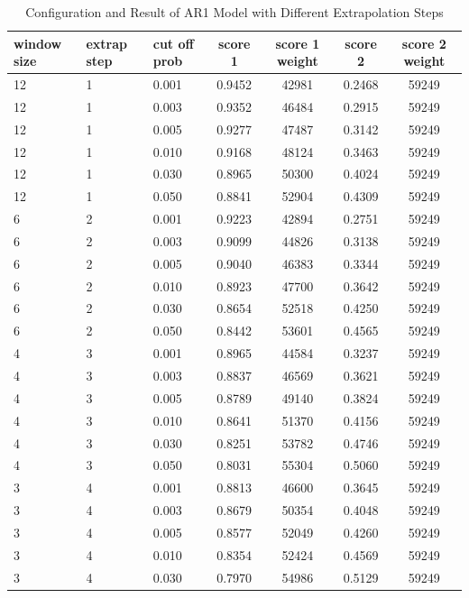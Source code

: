 \documentclass{article}
\begin{document}
\begin{longtable}[htbp]{l|l|l|*{4}{c}}
    \caption{Configuration and Result of AR1 Model with Different Extrapolation Steps}
    \label{tab:tab1.4.1} \\
    \textbf{window size} & \textbf{extrap step} & \textbf{cut off prob} & \textbf{score 1} & \textbf{score 1 weight} & \textbf{score 2} & \textbf{score 2 weight} \\
    \hline
    12 & 1 & 0.001 & 0.9452 & 42981 & 0.2468 & 59249\\
    12 & 1 & 0.003 & 0.9352 & 46484 & 0.2915 & 59249\\
    12 & 1 & 0.005 & 0.9277 & 47487 & 0.3142 & 59249\\
    12 & 1 & 0.010 & 0.9168 & 48124 & 0.3463 & 59249\\
    12 & 1 & 0.030 & 0.8965 & 50300 & 0.4024 & 59249\\
    12 & 1 & 0.050 & 0.8841 & 52904 & 0.4309 & 59249\\
    6 & 2 & 0.001 & 0.9223 & 42894 & 0.2751 & 59249\\
    6 & 2 & 0.003 & 0.9099 & 44826 & 0.3138 & 59249\\
    6 & 2 & 0.005 & 0.9040 & 46383 & 0.3344 & 59249\\
    6 & 2 & 0.010 & 0.8923 & 47700 & 0.3642 & 59249\\
    6 & 2 & 0.030 & 0.8654 & 52518 & 0.4250 & 59249\\
    6 & 2 & 0.050 & 0.8442 & 53601 & 0.4565 & 59249\\
    4 & 3 & 0.001 & 0.8965 & 44584 & 0.3237 & 59249\\
    4 & 3 & 0.003 & 0.8837 & 46569 & 0.3621 & 59249\\
    4 & 3 & 0.005 & 0.8789 & 49140 & 0.3824 & 59249\\
    4 & 3 & 0.010 & 0.8641 & 51370 & 0.4156 & 59249\\
    4 & 3 & 0.030 & 0.8251 & 53782 & 0.4746 & 59249\\
    4 & 3 & 0.050 & 0.8031 & 55304 & 0.5060 & 59249\\
    3 & 4 & 0.001 & 0.8813 & 46600 & 0.3645 & 59249\\
    3 & 4 & 0.003 & 0.8679 & 50354 & 0.4048 & 59249\\
    3 & 4 & 0.005 & 0.8577 & 52049 & 0.4260 & 59249\\
    3 & 4 & 0.010 & 0.8354 & 52424 & 0.4569 & 59249\\
    3 & 4 & 0.030 & 0.7970 & 54986 & 0.5129 & 59249\\

\end{longtable}
\end{document}
